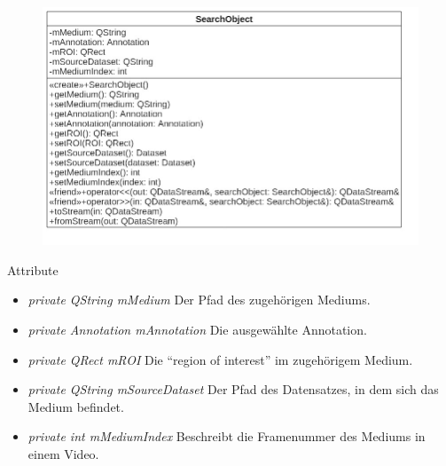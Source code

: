 \begin{figure}[H]
\centering
\includegraphics[scale=0.5]{img/Klassendiagramm/Klassen/Model/SearchObject}
\label{fig:searchObject}
\end{figure}

Attribute
\begin{itemize}
\item\textit{private QString mMedium} Der Pfad des zugehörigen Mediums.
\item\textit{private Annotation mAnnotation} Die ausgewählte Annotation.
\item\textit{private QRect mROI} Die \enquote{region of interest} im zugehörigem Medium.
\item\textit{private QString mSourceDataset} Der Pfad des Datensatzes, in dem sich das Medium befindet.
\item\textit{private int mMediumIndex} Beschreibt die Framenummer des Mediums in einem Video.
\end{itemize}

